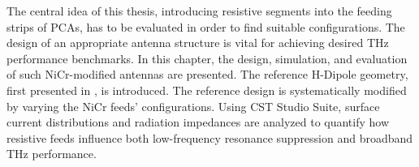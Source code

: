 The central idea of this thesis, introducing resistive segments into the feeding strips of PCAs, has to be evaluated in order to find suitable configurations. The design of an appropriate antenna structure is vital for achieving desired THz performance benchmarks. In this chapter, the design, simulation, and evaluation of such NiCr-modified antennas are presented. The reference H-Dipole geometry, first presented in  \cite{nandiErAsInAlGaAsPhotoconductors2021}, is introduced. The reference design is systematically modified by varying the NiCr feeds' configurations. Using CST
Studio Suite, surface current distributions and radiation impedances are analyzed to quantify how resistive
feeds influence both low-frequency resonance suppression and broadband THz performance.